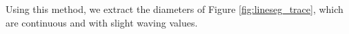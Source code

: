 Using this method, we extract the diameters of Figure
\ref{fig:lineseg_trace},
which are continuous and with slight
waving values.

